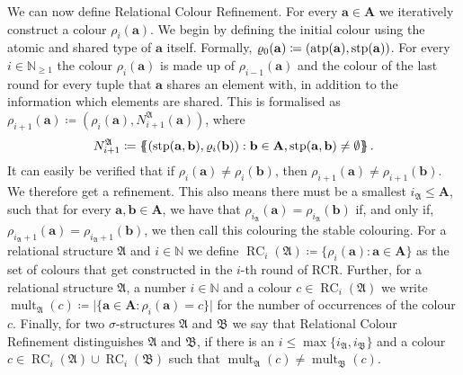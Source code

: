 We can now define Relational Colour Refinement.
For every $\mathbf a\in \mathbf A$ we iteratively construct a colour $\rho_i(\mathbf a)$.
We begin by defining the initial colour using the atomic and shared type of $\mathbf a$ itself.
Formally, $\varrho_0(\mathbf a)\coloneqq(\operatorname{atp}(\mathbf a), \operatorname{stp}(\mathbf a))$.
For every $i \in \mathbb N_{\geq 1}$ the colour $\rho_i(\mathbf a)$ is made up of $\rho_{i-1}(\mathbf a)$ and the colour of the last round for every tuple that $\mathbf a$ shares an element with, in addition to the information which elements are shared.
This is formalised as $\rho_{i+1}(\mathbf a)\coloneqq(\rho_{i}(\mathbf a), N_{i+1}^{\mathfrak A}(\mathbf a))$, where
$$N_{i+1}^{\mathfrak A}\coloneqq \left\{\kern-.35em\left\{(\operatorname{stp}(\mathbf a, \mathbf b), \varrho_{i}(\mathbf b)) : \mathbf b\in \mathbf A, \operatorname{stp}(\mathbf a, \mathbf b)\neq \emptyset\right\}\kern-.35em\right\}.$$
It can easily be verified that if $\rho_i(\mathbf a) \neq \rho_i(\mathbf b)$, then $\rho_{i+1}(\mathbf a)\neq\rho_{i+1}(\mathbf b)$. 
We therefore get a refinement.
This also means there must be a smallest $i_{\mathfrak A} \leq \mathbf A$, such that for every $\mathbf a, \mathbf b\in \mathbf A$, we have that $\rho_{i_{\mathfrak A}}(\mathbf a) = \rho_{i_{\mathfrak A}}(\mathbf b)$ if, and only if, $\rho_{i_{\mathfrak A}+1}(\mathbf a) = \rho_{i_{\mathfrak A}+1}(\mathbf b)$, we then call this colouring the stable colouring.
For a relational structure $\mathfrak A$ and $i\in \mathbb N$ we define $\operatorname{RC}_i(\mathfrak A)\coloneqq\{\rho_i(\mathbf a) : \mathbf a \in \mathbf A\}$ as the set of colours that get constructed in the $i$-th round of RCR.
Further, for a relational structure $\mathfrak A$, a number $i\in \mathbb N$ and a colour $c\in \operatorname{RC}_i(\mathfrak A)$ we write $\operatorname{mult}_{\mathfrak A}(c)\coloneqq \vert \{\mathbf a\in \mathbf A : \rho_i(\mathbf a)=c\}\vert$ for the number of occurrences of the colour $c$.
Finally, for two $\sigma$-structures $\mathfrak A$ and $\mathfrak B$ we say that Relational Colour Refinement distinguishes $\mathfrak A$ and $\mathfrak B$, if there is an $i \leq \max\{i_{\mathfrak A}, i_{\mathfrak B}\}$ and a colour $c\in \operatorname{RC}_i(\mathfrak A) \cup \operatorname{RC}_i(\mathfrak B)$ such that $\operatorname{mult}_{\mathfrak A}(c)\neq \operatorname{mult}_{\mathfrak B}(c)$.


